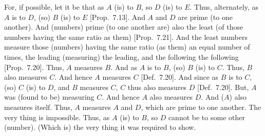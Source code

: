 \begin{Parallel}{}{}
{\epsfysize=1.3in
\centerline{}

For, if possible, let it be that as $A$ (is) to $B$, so $D$ (is) to $E$. 
Thus, alternately, as $A$ is to $D$, (so) $B$ (is) to $E$ [Prop.~7.13]. And $A$ and $D$ are prime (to one another).  And (numbers) prime (to one another are)
also the least (of those numbers having the same ratio as them) [Prop.~7.21]. And the least numbers measure those
(numbers) having the same ratio (as them) an equal number of times,
the leading (measuring) the leading, and the following the following [Prop.~7.20]. Thus, $A$ measures $B$. And as $A$
is to $B$, (so) $B$ (is) to $C$.  Thus, $B$ also measures $C$.  And hence
$A$ measures $C$ [Def.~7.20]. And since as $B$ is to
$C$, (so) $C$ (is) to $D$, and $B$ measures $C$, $C$ thus also measures
$D$ [Def.~7.20].  But, $A$ was (found to be) measuring $C$. And 
hence $A$ also measures $D$. And ($A$) also measures itself.  Thus, $A$
measures $A$ and $D$, which are prime to one another. The very thing is impossible. Thus, as $A$ (is) to $B$, so $D$ cannot be to some other (number). (Which is) the very thing it was required to show.}
\end{Parallel}

